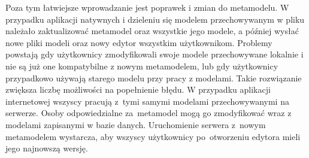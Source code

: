 Poza tym łatwiejsze wprowadzanie jest poprawek i zmian do metamodelu.
W przypadku aplikacji natywnych i dzieleniu się modelem przechowywanym w pliku
należało zaktualizować metamodel oraz wszystkie jego modele, a później wysłać
nowe pliki modeli oraz nowy edytor wszystkim użytkownikom. Problemy powstają
gdy użytkownicy zmodyfikowali swoje modele przechowywane lokalnie i nie są już
one kompatybilne z nowym metamodelem, lub gdy użytkownicy przypadkowo używają
starego modelu przy pracy z modelami. Takie rozwiązanie zwiększa liczbę
możliwości na popełnienie błędu. W przypadku aplikacji internetowej wszyscy
pracują z~tymi samymi modelami przechowywanymi na serwerze. Osoby
odpowiedzialne za~metamodel mogą go zmodyfikować wraz z modelami zapisanymi w
bazie danych. Uruchomienie serwera z~nowym metamodelem wystarcza, aby wszyscy
użytkownicy po~otworzeniu edytora \SiriusWeb{} mieli jego najnowszą
wersję.
